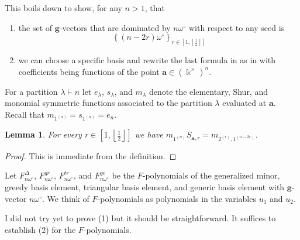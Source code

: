 \documentclass{amsart}
\newtheorem{lemma}[theorem]{Lemma}
\numberwithin{theorem}{section}
\newcommand{\bfa}{\boldsymbol{a}}
\newcommand{\bfg}{\boldsymbol{g}}
\newcommand{\kk}{\Bbbk}
\begin{document}
  This boils down to show, for any $n>1$, that
  \begin{enumerate}
    \item 
      the set of $\bfg$-vectors that are dominated by $n\omega^\circ$ with respect to any seed is 
      \[
        \left\{(n-2r)\omega^\circ \right\}_{r\in\left[1,\left\lfloor\frac{1}{2}\right\rfloor\right]}
      \]
  
    \item
      we can choose a specific basis and rewrite the last formula in \cite[Proposition 4.4]{RSW19} as in \cite[Theorem 1.2.1]{Qin19} with coefficients being functions of the point $\bfa\in(\kk^\times)^n$. 
  \end{enumerate}
  
  For a partition $\lambda \vdash n$ let $e_\lambda$, $s_\lambda$, and $m_\lambda$ denote the elementary, Shur, and monomial symmetric functions associated to the partition $\lambda$ evaluated at $\bfa$.
  Recall that $m_{1^{(n)}} = s_{1^{(n)}} = e_n$.
  
  \begin{lemma}
    For every $r\in\left[1,\left\lfloor\frac{1}{2}\right\rfloor\right]$ we have $m_{1^{(n)}} S_{\bfa,r} = m_{2^{(r)},1^{(n-2r)}}$.
  \end{lemma}
  \begin{proof}
    This is immediate from the definition.
  \end{proof}
  
  Let $F_{n\omega^\circ}^\Delta$, $F_{n\omega^\circ}^{gr}$, $F_{n\omega^\circ}^{tr}$, and $F_{n\omega^\circ}^{ge}$ be the $F$-polynomials of the generalized minor, greedy basis element, triangular basis element, and generic basis element with $\bfg$-vector $n\omega^\circ$.
  We think of $F$-polynomials as polynomials in the variables $u_1$ and $u_2$.
  
  I did not try yet to prove (1) but it should be straightforward.
  It suffices to establish (2) for the $F$-polynomials.
  
\end{document}

